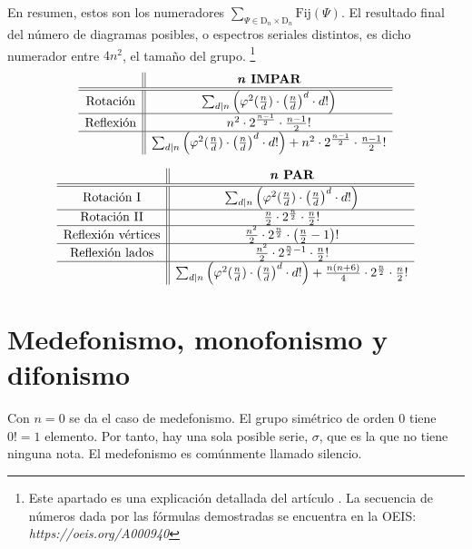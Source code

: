 		En resumen, estos son los numeradores $\sum_{\Psi\in\text{D}_{n}\times\text{D}_{n}}\text{Fij}(\Psi)$. El resultado final del número de diagramas posibles, o espectros seriales distintos, es dicho numerador entre $4n^2$, el tamaño del grupo. \footnote{Este apartado es una explicación detallada del artículo \cite{polygons}. La secuencia de números dada por las fórmulas demostradas se encuentra en la OEIS: \textit{https://oeis.org/A000940}}		
		\def\arraystretch{1.25}
		\[\begin{array}{c||c}
		&\textbf{\textit{n} IMPAR}\\\hline\hline
		\text{Rotación}&\sum_{d|n}\left(\varphi^2(\frac{n}{d})\cdot\left(\frac{n}{d}\right)^d\cdot d!\right)\\\hline
		\text{Reflexión}&n^2\cdot2^{\frac{n-1}{2}}\cdot\frac{n-1}{2}!\\\hline
		&\sum_{d|n}\left(\varphi^2(\frac{n}{d})\cdot\left(\frac{n}{d}\right)^d\cdot d!\right)+n^2\cdot2^{\frac{n-1}{2}}\cdot\frac{n-1}{2}!\\
		\end{array}\]
		
		\[\begin{array}{c||c}
		&\textbf{\textit{n} PAR}\\\hline\hline
		\text{Rotación I}&\sum_{d|n}\left(\varphi^2(\frac{n}{d})\cdot\left(\frac{n}{d}\right)^d\cdot d!\right)\\\hline
		\text{Rotación II}&\frac{n}{2}\cdot2^{\frac{n}{2}}\cdot\frac{n}{2}!\\\hline
		\text{Reflexión vértices}&\frac{n^2}{2}\cdot2^{\frac{n}{2}}\cdot\left(\frac{n}{2}-1\right)!\\\hline
		\text{Reflexión lados}&\frac{n^2}{2}\cdot2^{\frac{n}{2}-1}\cdot\frac{n}{2}!\\\hline
		&\sum_{d|n}\left(\varphi^2(\frac{n}{d})\cdot\left(\frac{n}{d}\right)^d\cdot d!\right)+\frac{n(n+6)}{4}\cdot2^{\frac{n}{2}}\cdot\frac{n}{2}!\\
		\end{array}\]
		\def\arraystretch{1}
		
	\section{Medefonismo, monofonismo y difonismo}
	\label{monodi}
		Con $n=0$ se da el caso de medefonismo. El grupo simétrico de orden 0 tiene $0!=1$ elemento. Por tanto, hay una sola posible serie, $\sigma$, que es la que no tiene ninguna nota. El medefonismo es comúnmente llamado silencio.
		
